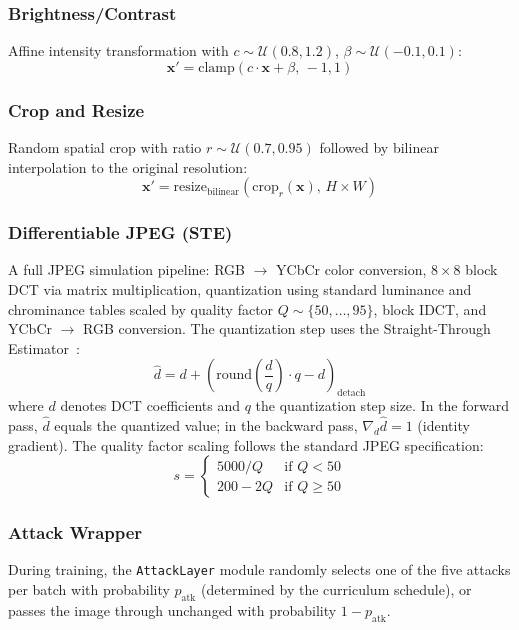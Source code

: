 \documentclass[conference]{IEEEtran}
\newcommand{\Ucal}{\mathcal{U}}
\begin{document}
\subsubsection{Brightness/Contrast}
Affine intensity transformation with $c \sim \Ucal(0.8, 1.2)$, $\beta \sim \Ucal(-0.1, 0.1)$:
\begin{equation}
    \mathbf{x}' = \text{clamp}(c \cdot \mathbf{x} + \beta,\, -1, 1)
\end{equation}

\subsubsection{Crop and Resize}
Random spatial crop with ratio $r \sim \Ucal(0.7, 0.95)$ followed by bilinear interpolation to the original resolution:
\begin{equation}
    \mathbf{x}' = \text{resize}_\text{bilinear}(\text{crop}_r(\mathbf{x}),\, H \times W)
\end{equation}

\subsubsection{Differentiable JPEG (STE)}
A full JPEG simulation pipeline: RGB $\to$ YCbCr color conversion, $8\times8$ block DCT via matrix multiplication, quantization using standard luminance and chrominance tables scaled by quality factor $Q \sim \{50, \ldots, 95\}$, block IDCT, and YCbCr $\to$ RGB conversion.
The quantization step uses the Straight-Through Estimator~\cite{bengio2013estimating}:
\begin{equation}
    \hat{d} = d + \left(\text{round}\!\left(\frac{d}{q}\right) \cdot q - d\right)_\text{detach}
    \label{eq:ste}
\end{equation}
where $d$ denotes DCT coefficients and $q$ the quantization step size.
In the forward pass, $\hat{d}$ equals the quantized value; in the backward pass, $\nabla_d \hat{d} = 1$ (identity gradient).
The quality factor scaling follows the standard JPEG specification:
\begin{equation}
    s = \begin{cases} 5000 / Q & \text{if } Q < 50 \\ 200 - 2Q & \text{if } Q \geq 50 \end{cases}
    \label{eq:jpeg_scale}
\end{equation}

\subsubsection{Attack Wrapper}
During training, the \texttt{AttackLayer} module randomly selects one of the five attacks per batch with probability $p_\text{atk}$ (determined by the curriculum schedule), or passes the image through unchanged with probability $1 - p_\text{atk}$.
\end{document}
